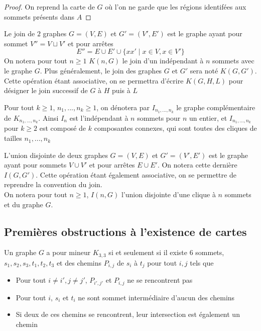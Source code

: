 \documentclass{scrartcl}
\begin{document}
\begin{flushleft}
\begin{proof}
    On reprend la carte de $G$ où l'on ne garde que les régions identifées aux sommets présents dans $A$
\end{proof}

\begin{def*}[Join]
    Le join de $2$ graphes $G = (V, E)$ et $G' = (V', E')$ est le graphe ayant pour sommet $V'' = V \sqcup V'$ et pour arrêtes
    \[ E'' = E \cup E' \cup \{ xx' \mid x \in V, x \in V' \} \]
    On notera pour tout $n \geq 1$ $K(n, G)$ le join d'un indépendant à $n$ sommets avec le graphe $G$. Plus généralement,
    le join des graphes $G$ et $G'$ sera noté $K(G, G')$. Cette opération étant associative, on se permettra
    d'écrire $K(G, H, L)$ pour désigner le join successif de $G$ à $H$ puis à $L$
\end{def*}

\begin{def*}
    Pour tout $k \geq 1$, $n_1, ..., n_k \geq 1$, on dénotera par $I_{n_1, ..., n_k}$ le graphe complémentaire de $K_{n_1, ..., n_k}$.
    Ainsi $I_n$ est l'indépendant à $n$ sommets pour $n$ un entier, et $I_{n_1, ..., n_k}$ pour $k \geq 2$ est composé de $k$
    composantes connexes, qui sont toutes des cliques de tailles $n_1, ..., n_k$
\end{def*}

\begin{def*}
    L'union disjointe de deux graphes $G = (V, E)$ et $G' = (V', E')$ est le graphe ayant pour sommets $V \cup V'$ et pour arrêtes
    $E \cup E'$. On notera cette dernière $I(G, G')$. Cette opération étant également associative, on se permettre de reprendre la
    convention du join.\\
    On notera pour tout $n \geq 1$, $I(n, G)$ l'union disjointe d'une clique à $n$ sommets et du graphe $G$.
\end{def*}

\subsection{Premières obstructions à l'existence de cartes}

\begin{lem}\label{CNSK33}
    Un graphe $G$ a pour mineur $K_{3,3}$ si et seulement si il existe $6$ sommets, $s_1, s_2, s_3, t_1, t_2, t_3$ et des chemins
    $P_{i,j}$ de $s_i$ à $t_j$ pour tout $i, j$ tels que
    \begin{itemize}
        \item Pour tout $i \neq i', j \neq j'$, $P_{i',j'}$ et $P_{i, j}$ ne se rencontrent pas
        \item Pour tout $i$, $s_i$ et $t_i$ ne sont sommet intermédiaire d'aucun des chemins
        \item Si deux de ces chemins se rencontrent, leur intersection est également un chemin
    \end{itemize}
\end{lem}


\end{flushleft}
\end{document}
